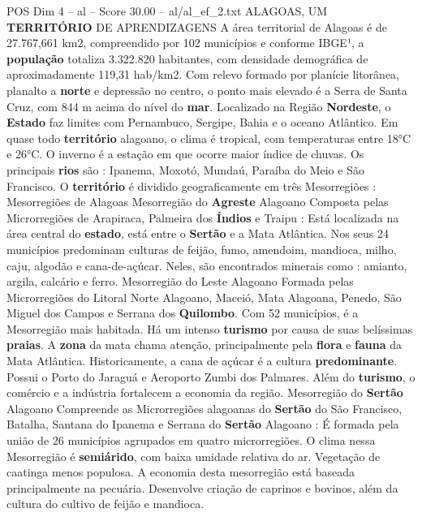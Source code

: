 \begin{textsample}{POS Dim 4 – al – Score 30.00 – al/al\_ef\_2.txt}  \label{ex:f4_pos_041}
ALAGOAS, UM \textbf{TERRITÓRIO} DE APRENDIZAGENS A área territorial de Alagoas é de 27.767,661 km2, compreendido por 102 municípios e conforme IBGE¹, a \textbf{população} totaliza 3.322.820 habitantes, com densidade demográfica de aproximadamente 119,31 hab/km2.
Com relevo formado por planície litorânea, planalto a \textbf{norte} e depressão no centro, o ponto mais elevado é a Serra de Santa Cruz, com 844 m acima do nível do \textbf{mar}.
Localizado na Região \textbf{Nordeste}, o \textbf{Estado} faz limites com Pernambuco, Sergipe, Bahia e o oceano Atlântico.
Em quase todo \textbf{território} alagoano, o clima é tropical, com temperaturas entre 18{\EmojiFont °}C e 26{\EmojiFont °}C.
O inverno é a estação em que ocorre maior índice de chuvas.
Os principais \textbf{rios} são : Ipanema, Moxotó, Mundaú, Paraíba do Meio e São Francisco.
O \textbf{território} é dividido geograficamente em três Mesorregiões : Mesorregiões de Alagoas Mesorregião do \textbf{Agreste} Alagoano Composta pelas Microrregiões de Arapiraca, Palmeira dos \textbf{Índios} e Traipu : Está localizada na área central do \textbf{estado}, está entre o \textbf{Sertão} e a Mata Atlântica.
Nos seus 24 municípios predominam culturas de feijão, fumo, amendoim, mandioca, milho, caju, algodão e cana-de-açúcar.
Neles, são encontrados minerais como : amianto, argila, calcário e ferro.
Mesorregião do Leste Alagoano Formada pelas Microrregiões do Litoral Norte Alagoano, Maceió, Mata Alagoana, Penedo, São Miguel dos Campos e Serrana dos \textbf{Quilombo}.
Com 52 municípios, é a Mesorregião mais habitada.
Há um intenso \textbf{turismo} por causa de suas belíssimas \textbf{praias}.
A \textbf{zona} da mata chama atenção, principalmente pela \textbf{flora} e \textbf{fauna} da Mata Atlântica.
Historicamente, a cana de açúcar é a cultura \textbf{predominante}.
Possui o Porto do Jaraguá e Aeroporto Zumbi dos Palmares.
Além do \textbf{turismo}, o comércio e a indústria fortalecem a economia da região.
Mesorregião do \textbf{Sertão} Alagoano Compreende as Microrregiões alagoanas do \textbf{Sertão} do São Francisco, Batalha, Santana do Ipanema e Serrana do \textbf{Sertão} Alagoano : É formada pela união de 26 municípios agrupados em quatro microrregiões.
O clima nessa Mesorregião é \textbf{semiárido}, com baixa umidade relativa do ar.
Vegetação de caatinga menos populosa.
A economia desta mesorregião está baseada principalmente na pecuária.
Desenvolve criação de caprinos e bovinos, além da cultura do cultivo de feijão e mandioca.

\end{textsample}
